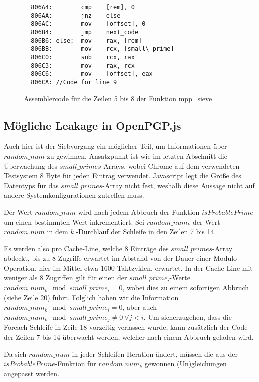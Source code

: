 \begin{figure}[h]
\label{fig:assemblyMppSieve}
\renewcommand\fcolorbox[4][]{\textcolor{black}{\strut#4}}
\small
\begin{verbatim}
  806A4:        cmp    [rem], 0
  806AA:        jnz    else
  806AC:        mov    [offset], 0  
  806B4:        jmp    next_code
  806B6: else:  mov    rax, [rem]
  806BB:        mov    rcx, [small\_prime]
  806C0:        sub    rcx, rax
  806C3:        mov    rax, rcx
  806C6:        mov    [offset], eax
  806CA: //Code for line 9
\end{verbatim}
\normalsize
\caption{Assemblercode für die Zeilen 5 bis 8 der Funktion mpp_sieve}
\end{figure}

\subsection{Mögliche Leakage in OpenPGP.js}

Auch hier ist der Siebvorgang ein möglicher Teil, um Informationen über $random\_num$ zu gewinnen.
Ansatzpunkt ist wie im letzten Abschnitt die Überwachung des $small\_primes$-Arrays, wobei Chrome auf dem verwendeten Testsystem 8 Byte für jeden Eintrag verwendet. Javascript legt die Größe des Datentyps für das $small\_primes$-Array nicht fest, weshalb diese Aussage nicht auf andere Systemkonfigurationen zutreffen muss.

Der Wert $random\_num$ wird nach jedem Abbruch der Funktion $isProbablePrime$ um einen bestimmten Wert inkrementiert.
Sei $random\_num_k$ der Wert $random\_num$ in dem $k.$-Durchlauf der Schleife in den Zeilen 7 bis 14.

Es werden also pro Cache-Line, welche 8 Einträge des $small\_primes$-Array abdeckt, bis zu 8 Zugriffe erwartet im Abstand von der Dauer einer Modulo-Operation, hier im Mittel etwa 1600 Taktzyklen, erwartet.
In der Cache-Line mit weniger als 8 Zugriffen gilt für einen der $small\_prime_i$-Werte $random\_num_k \mod small\_prime_i = 0$, wobei dies zu einem sofortigen Abbruch (siehe Zeile 20) führt.
Folglich haben wir die Information $random\_num_k \mod small\_prime_i = 0$, aber auch $random\_num_k \mod small\_prime_j \neq 0 \: \forall j < i$.
Um sicherzugehen, dass die Foreach-Schleife in Zeile 18 vorzeitig verlassen wurde, kann zusätzlich der Code der Zeilen 7 bis 14 überwacht werden, welcher nach einem Abbruch geladen wird.

Da sich $random\_num$ in jeder Schleifen-Iteration ändert, müssen die aus der $isProbablePrime$-Funktion für $random\_num_k$ gewonnen (Un)gleichungen  angepasst werden.

